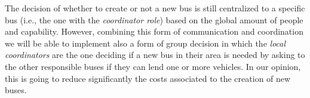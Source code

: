 \documentclass[a4paper]{article}
\begin{document}
The decision of whether to create or not a new bus is still centralized to a specific bus (i.e., the one with the \textit{coordinator role}) based on the global amount of people and capability. However, combining this form of communication and coordination we will be able to implement also a form of group decision in which the \textit{local coordinators} are the one deciding if a new bus in their area is needed by asking to the other responsible buses if they can lend one or more vehicles. In our opinion, this is going to reduce significantly the costs associated to the creation of new buses.
\end{document}
